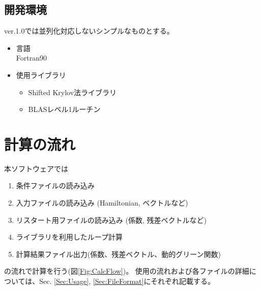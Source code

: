 \documentclass[12pt,titlepage]{jarticle}
\begin{document}
\subsection{開発環境}
ver.1.0では並列化対応しないシンプルなものとする。
\begin{itemize}
\item{言語}\\
 Fortran90

 \item{使用ライブラリ}
 \begin{itemize}
 \item{Shifted Krylov法ライブラリ}
 \item{BLASレベル1ルーチン}
\end{itemize}

\end{itemize}

\newpage
\section{計算の流れ}
本ソフトウェアでは
\begin{enumerate}
\item{条件ファイルの読み込み}
\item{入力ファイルの読み込み (Hamiltonian, ベクトルなど)}
\item{リスタート用ファイルの読み込み (係数, 残差ベクトルなど)}
\item{ライブラリを利用したループ計算}
\item{計算結果ファイル出力(係数、残差ベクトル、動的グリーン関数)}
\end{enumerate}
の流れで計算を行う(図\ref{Fig:CalcFlow})。
使用の流れおよび各ファイルの詳細については、Sec. \ref{Sec:Usage}, \ref{Sec:FileFormat}にそれぞれ記載する。
\end{document}
